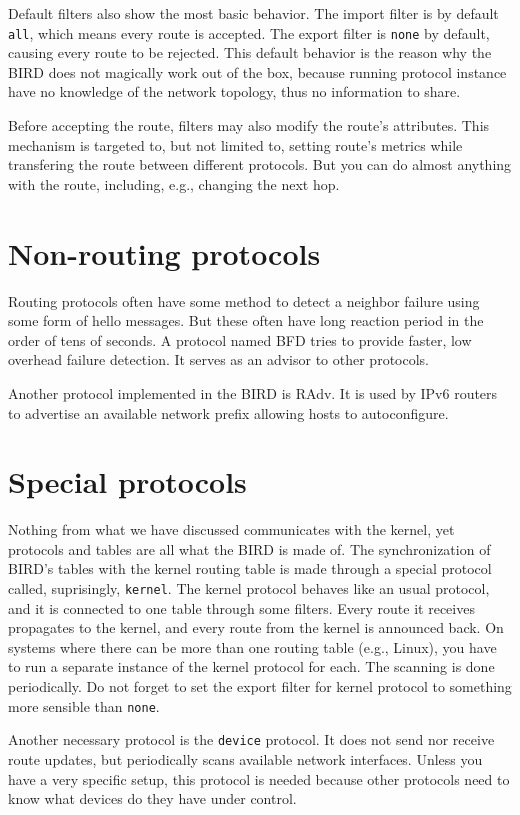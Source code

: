 Default filters also show the most basic behavior. The import filter is by default
\texttt{all}, which means every route is accepted. The export filter is
\texttt{none} by default, causing every route to be rejected. This default
behavior is the reason why the BIRD does not magically work out of the box,
because running protocol instance have no knowledge of the network topology,
thus no information to share.

Before accepting the route, filters may also modify the route's attributes.
This mechanism is targeted to, but not limited to, setting route's metrics
while transfering the route between different protocols. But you can do almost
anything with the route, including, e.g., changing the next hop.

\section{Non-routing protocols}
Routing protocols often have some method to detect a neighbor failure using
some form of hello messages. But these often have long reaction period in the
order of tens of seconds. A protocol named BFD tries to provide faster, low
overhead failure detection. It serves as an advisor to other protocols.

Another protocol implemented in the BIRD is RAdv. It is used by IPv6 routers to
advertise an available network prefix allowing hosts to autoconfigure.

\section{Special protocols}
Nothing from what we have discussed communicates with the kernel, yet protocols
and tables are all what the BIRD is made of. The synchronization of BIRD's
tables with the kernel routing table is made through a special protocol
called, suprisingly, \texttt{kernel}. The kernel protocol behaves like an usual
protocol, and it is connected to one table through some filters. Every route it
receives propagates to the kernel, and every route from the kernel is announced
back. On systems where there can be more than one routing table (e.g., Linux),
you have to run a separate instance of the kernel protocol for each. The
scanning is done periodically. Do not forget to set the export filter for
kernel protocol to something more sensible than \texttt{none}.

Another necessary protocol is the \texttt{device} protocol. It does not send
nor receive route updates, but periodically scans available network interfaces.
Unless you have a very specific setup, this protocol is needed because other
protocols need to know what devices do they have under control.

